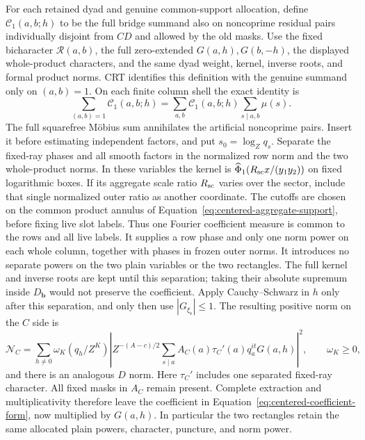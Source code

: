 \documentclass[11pt,a4paper]{article}
\numberwithin{equation}{section}
\numberwithin{figure}{section}
\theoremstyle{definition}
\theoremstyle{remark}
\begin{document}
For each retained dyad and genuine common-support allocation, define
\(\mathcal C_1(a,b;h)\) to be the full bridge summand also on noncoprime
residual pairs individually disjoint from \(CD\) and allowed by the old
masks.  Use the fixed bicharacter \(\mathcal R(a,b)\), the full
zero-extended \(G(a,h),G(b,-h)\), the displayed whole-product characters,
and the same dyad weight, kernel, inverse roots, and formal product norms.
CRT identifies this definition with the genuine summand only on
\((a,b)=1\).  On each finite column shell the exact identity is
\[
 \sum_{(a,b)=1}\mathcal C_1(a,b;h)
 =\sum_{a,b}\mathcal C_1(a,b;h)\sum_{s\mid a,b}\mu(s).
\]
The full squarefree M\"obius sum annihilates the artificial noncoprime
pairs.  Insert it before estimating independent factors, and put
\(s_0=\log_Zq_s\).
Separate the fixed-ray phases and all smooth factors in the normalized
row norm and the two whole-product norms.  In these variables the
kernel is \(\widehat\Phi_1(R_{\rm sc}x/(y_1y_2))\) on fixed logarithmic
boxes.  If its aggregate scale ratio \(R_{\rm sc}\) varies over the sector,
include that single normalized outer ratio as another coordinate.
The cutoffs are chosen on the common product annulus of
Equation~\eqref{eq:centered-aggregate-support}, before fixing live slot
labels.  Thus one Fourier coefficient measure is common to the rows and
all live labels.  It supplies a row phase and only one norm power on each
whole column, together with phases in frozen outer norms.  It introduces
no separate powers on the two plain variables or the two rectangles.
The full kernel and inverse roots are kept until this separation;
taking their absolute supremum inside \(D_{\mathbf b}\) would not
preserve the coefficient.  Apply Cauchy--Schwarz in \(h\) only after this separation,
and only then use \(|G_{\xi_{\mathfrak r}}|\le1\).  The resulting positive norm
on the \(C\) side is
\[
 \mathcal N_C=
 \sum_{h\ne0}\omega_K(q_h/Z^K)
 \left|Z^{-(A-c)/2}
   \sum_{s\mid a}A_C(a)\tau_C'(a)q_a^{it}G(a,h)\right|^2,
 \qquad \omega_K\ge0,
\]
and there is an analogous \(D\) norm.  Here \(\tau_C'\) includes
one separated fixed-ray character.  All fixed masks in \(A_C\)
remain present.  Complete extraction and multiplicativity therefore leave
the coefficient in Equation~\eqref{eq:centered-coefficient-form}, now
multiplied by \(G(a,h)\).  In particular the two rectangles retain the
same allocated plain powers, character, puncture, and norm power.
\end{document}
